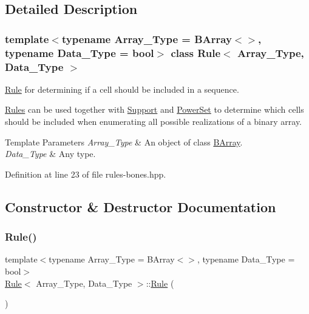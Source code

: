 \subsection{Detailed Description}
\subsubsection*{template$<$typename Array\+\_\+\+Type = B\+Array$<$$>$, typename Data\+\_\+\+Type = bool$>$\newline
class Rule$<$ Array\+\_\+\+Type, Data\+\_\+\+Type $>$}

\hyperlink{class_rule}{Rule} for determining if a cell should be included in a sequence. 

\hyperlink{class_rules}{Rules} can be used together with {\ttfamily \hyperlink{class_support}{Support}} and {\ttfamily \hyperlink{class_power_set}{Power\+Set}} to determine which cells should be included when enumerating all possible realizations of a binary array. 
\begin{DoxyTemplParams}{Template Parameters}
{\em Array\+\_\+\+Type} & An object of class {\ttfamily \hyperlink{class_b_array}{B\+Array}}. \\
\hline
{\em Data\+\_\+\+Type} & Any type. \\
\hline
\end{DoxyTemplParams}


Definition at line 23 of file rules-\/bones.\+hpp.



\subsection{Constructor \& Destructor Documentation}
\mbox{\label{class_rule_aef92e54d53dc77b5cad2f819b5f8f4bf}} 
\subsubsection{\texorpdfstring{Rule()}{Rule()}\hspace{0.1cm}{\footnotesize\ttfamily [1/2]}}
{\footnotesize\ttfamily template$<$typename Array\+\_\+\+Type = B\+Array$<$$>$, typename Data\+\_\+\+Type = bool$>$ \\
\hyperlink{class_rule}{Rule}$<$ Array\+\_\+\+Type, Data\+\_\+\+Type $>$\+::\hyperlink{class_rule}{Rule} (\begin{DoxyParamCaption}{ }\end{DoxyParamCaption})\hspace{0.3cm}{\ttfamily [inline]}}



